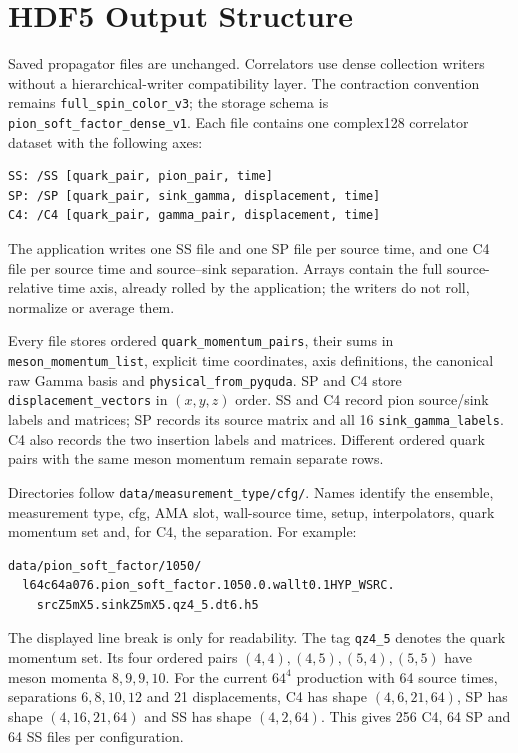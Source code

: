 \documentclass[11pt,a4paper]{article}
\newcommand{\walltag}[1]{\texttt{#1}}
\begin{document}
\section{HDF5 Output Structure}
\begin{sloppypar}

Saved propagator files are unchanged. Correlators use dense collection writers
without a hierarchical-writer compatibility layer. The contraction convention
remains \walltag{full\_spin\_color\_v3}; the storage schema is
\walltag{pion\_soft\_factor\_dense\_v1}.
Each file contains one complex128 correlator dataset with the following axes:
\begin{verbatim}
SS: /SS [quark_pair, pion_pair, time]
SP: /SP [quark_pair, sink_gamma, displacement, time]
C4: /C4 [quark_pair, gamma_pair, displacement, time]
\end{verbatim}
The application writes one SS file and one SP file per source time, and one
C4 file per source time and source--sink separation. Arrays contain the full
source-relative time axis, already rolled by the application; the writers do
not roll, normalize or average them.

Every file stores ordered \walltag{quark\_momentum\_pairs}, their sums in
\walltag{meson\_momentum\_list}, explicit time coordinates, axis definitions,
the canonical raw Gamma basis and \walltag{physical\_from\_pyquda}.
SP and C4 store \walltag{displacement\_vectors} in $(x,y,z)$ order.
SS and C4 record pion source/sink labels and matrices; SP records its source
matrix and all 16 \walltag{sink\_gamma\_labels}. C4 also records the two
insertion labels and matrices. Different ordered quark pairs with the same
meson momentum remain separate rows.

Directories follow \walltag{data/measurement\_type/cfg/}. Names identify the
ensemble, measurement type, cfg, AMA slot, wall-source time, setup,
interpolators, quark momentum set and, for C4, the separation. For example:
\begin{verbatim}
data/pion_soft_factor/1050/
  l64c64a076.pion_soft_factor.1050.0.wallt0.1HYP_WSRC.
    srcZ5mX5.sinkZ5mX5.qz4_5.dt6.h5
\end{verbatim}
The displayed line break is only for readability. The tag
\walltag{qz4\_5} denotes the quark momentum set. Its four ordered pairs
$(4,4),(4,5),(5,4),(5,5)$ have meson momenta $8,9,9,10$.
For the current $64^4$ production with 64 source times, separations
$6,8,10,12$ and 21 displacements, C4 has shape $(4,6,21,64)$, SP has
shape $(4,16,21,64)$ and SS has shape $(4,2,64)$. This gives
256 C4, 64 SP and 64 SS files per configuration.

\end{sloppypar}
\end{document}
